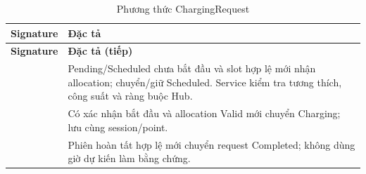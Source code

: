 
\begin{longtable}{|L{58mm}|L{81mm}|}
\caption{Phương thức ChargingRequest}\\\hline
\textbf{Signature} & \textbf{Đặc tả}\\\hline
\endfirsthead
\hline\textbf{Signature} & \textbf{Đặc tả (tiếp)}\\\hline\endhead
{} & Pending/Scheduled chưa bắt đầu và slot hợp lệ mới nhận allocation; chuyển/giữ Scheduled. Service kiểm tra tương thích, công suất và ràng buộc Hub.\\\hline
{} & Có xác nhận bắt đầu và allocation Valid mới chuyển Charging; lưu cùng session/point.\\\hline
{} & Phiên hoàn tất hợp lệ mới chuyển request Completed; không dùng giờ dự kiến làm bằng chứng.\\\hline
\end{longtable}


